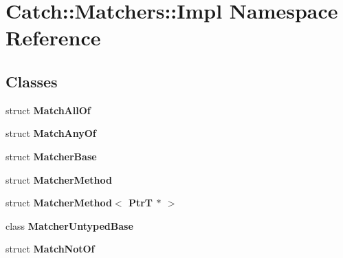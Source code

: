 \section{Catch\+:\+:Matchers\+:\+:Impl Namespace Reference}
\label{namespace_catch_1_1_matchers_1_1_impl}
\subsection*{Classes}
\begin{DoxyCompactItemize}
\item 
struct \textbf{ Match\+All\+Of}
\item 
struct \textbf{ Match\+Any\+Of}
\item 
struct \textbf{ Matcher\+Base}
\item 
struct \textbf{ Matcher\+Method}
\item 
struct \textbf{ Matcher\+Method$<$ Ptr\+T $\ast$ $>$}
\item 
class \textbf{ Matcher\+Untyped\+Base}
\item 
struct \textbf{ Match\+Not\+Of}
\end{DoxyCompactItemize}
